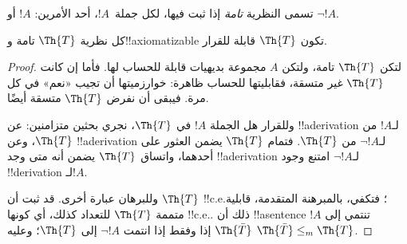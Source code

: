 \documentclass[../../../include/open-logic-section]{subfiles}
\begin{document}


تسمى النظرية {\em تامة} إذا ثبت فيها، لكل جملة~$!A$، أحد الأمرين:
$!A$ أو $\lnot !A$.

\begin{lem}
كل نظرية $\Th{T}$ تامة و!!{axiomatizable} تكون
$\Th{T}$ قابلة للقرار.
\end{lem}

\begin{proof}
لتكن $\Th{T}$ تامة، ولتكن $A$ مجموعة بديهيات قابلة للحساب لها.
فأما إن كانت $\Th{T}$ غير متسقة، فقابليتها للحساب ظاهرة:
خوارزميتها أن تجيب «نعم» في كل مرة. فيبقى أن نفرض $\Th{T}$
متسقة أيضًا.

وللقرار هل الجملة $!A$ في $\Th{T}$، نجري بحثين متزامنين:
عن !!a{derivation} لـ$!A$ من $\Th{T}$، وعن !!a{derivation}
لـ$\lnot
!A$ من $\Th{T}$. فتمام $\Th{T}$ يضمن العثور على أحدهما،
واتساق $\Th{T}$ يضمن أنه متى وجد !!a{derivation} لـ$\lnot !A$
امتنع وجود !!{derivation} لـ$!A$.

وللبرهان عبارة أخرى. قد ثبت أن $\Th{T}$ !!{c.e.}؛ فتكفي، بالمبرهنة
المتقدمة، قابلية متممة $\Th{T}$ للتعداد كذلك، أي كونها
!!{c.e.}. ذلك أن !!a{sentence} $!A$ تنتمي إلى $\Th{\bar T}$ إذا
وفقط إذا انتمت $\lnot !A$ إلى $\Th{T}$؛ وعليه
$\Th{\bar T}\leq_m\Th{T}$.
\end{proof}
\end{document}
